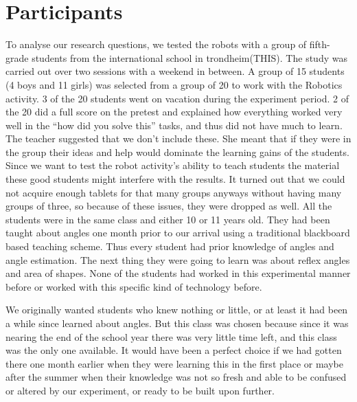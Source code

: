\chapter{Participants}
To analyse our research questions, we tested the robots with a group of fifth-grade students from the international school in trondheim(THIS). The study was carried out over two sessions with a weekend in between. A group of 15 students (4 boys and 11 girls) was selected from a group of 20 to work with the Robotics activity. 3 of the 20 students went on vacation during the experiment period. 2 of the 20 did a full score on the pretest and explained how everything worked very well in the ``how did you solve this'' tasks, and thus did not have much to learn. The teacher suggested that we don't include these. She meant that if they were in the group their ideas and help would dominate the learning gains of the students. Since we want to test the robot activity's ability to teach students the material these good students might interfere with the results. It turned out that we could not acquire enough tablets for that many groups anyways without having many groups of three, so because of these issues, they were dropped as well. All the students were in the same class and either 10 or 11 years old. They had been taught about angles one month prior to our arrival using a traditional blackboard based teaching scheme. Thus every student had prior knowledge of angles and angle estimation. The next thing they were going to learn was about reflex angles and area of shapes. None of the students had worked in this experimental manner before or worked with this specific kind of technology before.

\bigskip\noindent
We originally wanted students who knew nothing or little, or at least it had been a while since learned about angles. But this class was chosen because since it was nearing the end of the school year there was very little time left, and this class was the only one available. It would have been a perfect choice if we had gotten there one month earlier when they were learning this in the first place or maybe after the summer when their knowledge was not so fresh and able to be confused or altered by our experiment, or ready to be built upon further. 